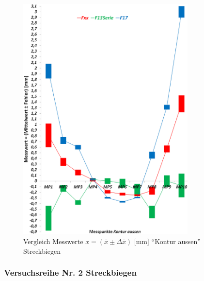 \documentclass[12pt,a4paper,parskip]{scrartcl}
\begin{document}
\begin{figure}[hbtp] 
\centering
\includegraphics[width=0.8\textwidth]{mitkontausstrckb}
\caption{Vergleich Messwerte $x=(\bar{x} \pm \Delta\bar{x}) $ [mm]  "`Kontur aussen"' Streckbiegen}
\label{fig:mitstrckb}
\end{figure}

\newpage
\subsubsection{Versuchsreihe Nr. 2 Streckbiegen}
\end{document}
